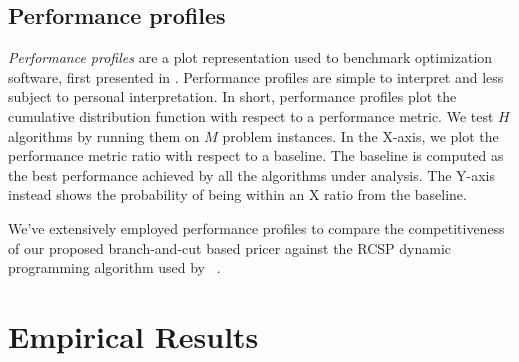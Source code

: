 \subsection{Performance profiles}
\label{sec:results-performance-profiles}

\textit{Performance profiles} are a plot representation used to benchmark optimization software,
first presented in \textcite{dolan2002}.
Performance profiles are simple to interpret and less subject to personal interpretation.
In short, performance profiles plot the cumulative distribution function with respect to a performance metric.
We test $H$ algorithms by running them on $M$ problem instances.
In the X-axis, we plot the performance metric ratio with respect to a baseline.
The baseline is computed as the best performance achieved by all the algorithms under analysis.
The Y-axis instead shows the probability of being within an X ratio from the baseline.

\medskip

We've extensively employed performance profiles to compare the competitiveness of
our proposed branch-and-cut based pricer
against the RCSP dynamic programming algorithm used by \bapcod\ \parencite{pessoa2020a}.

\begin{comment}
In this thesis, we will use performance profiles extensively to measure each solver by exploiting two performance metrics: \textbf{Time metric}, \textbf{Cost metric}.

A \textbf{Time performance profile} will tell us which resolution method is the fastest in terms of runtime.
A \textbf{Cost performance profile}, instead, will show us the cost ratio of the best upper bound obtained from each resolution method.
The ground truth optimal, as extracted from the dataset, is used instead as the cost baseline.
\end{comment}

\section{Empirical Results}
\label{sec:results-empirical-results}





